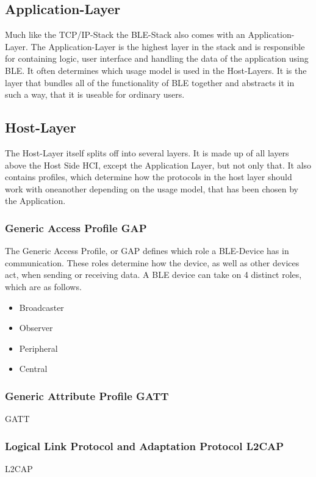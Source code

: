 \subsection{Application-Layer}
Much like the TCP/IP-Stack the BLE-Stack also comes with an Application-Layer. The Application-Layer is the highest layer in the stack and is responsible for containing logic, user interface and handling the data of the application using BLE. It often determines which usage model is used in the Host-Layers.
It is the layer that bundles all of the functionality of BLE together and abstracts it in such a way, that it is useable for ordinary users.

\subsection{Host-Layer}
The Host-Layer itself splits off into several layers. It is made up of all layers above the Host Side HCI, except the Application Layer, but not only that. It also contains profiles, which
determine how the protocols in the host layer should work with oneanother depending on the usage model, that has been chosen by the Application.

\subsubsection{Generic Access Profile GAP}
The Generic Access Profile, or GAP defines which role a BLE-Device has in communication. These roles determine how the device, as well as other devices act, when sending or receiving data.
A BLE device can take on 4 distinct roles, which are as follows.

\begin{itemize}
\item{Broadcaster}
\item{Observer}
\item{Peripheral}
\item{Central}
\end{itemize}


\subsubsection{Generic Attribute Profile GATT}
GATT

\subsubsection{Logical Link Protocol and Adaptation Protocol L2CAP}
L2CAP

